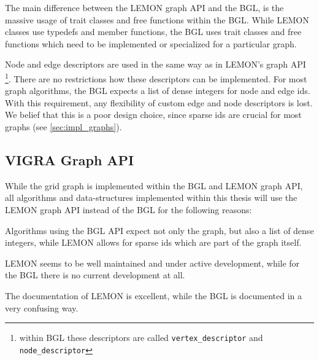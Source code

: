 The main difference between the LEMON graph API and the BGL,
is the massive usage of trait classes and free functions within the BGL.
While LEMON classes use typedefs and member functions, 
the BGL uses trait classes and free functions which need 
to be implemented or specialized for a particular graph.

Node and edge descriptors are used in the same way as in LEMON's
graph API \footnote{within BGL these descriptors are called \lstinline{vertex_descriptor} and 
\lstinline{node_descriptor}}.
There are no restrictions how these descriptors can be implemented.
For most graph algorithms, the BGL expects a list of dense integers for
node and edge ids.
With this requirement, any flexibility of custom edge and node descriptors is lost.
We belief that this is a poor design choice, since sparse ids
are crucial for most graphs (see \cref{sec:impl_graphs}).




\subsection{VIGRA Graph API}

While the grid graph is implemented within the BGL and LEMON graph API,
all algorithms and data-structures implemented within this thesis will
use the LEMON graph API instead of the BGL 
for the following reasons:
\begin{inparaenum}[(i)]
\item Algorithms using the BGL API expect not only the graph, but also 
a list of dense integers, while LEMON allows for sparse ids which 
are part of the graph itself.
\item LEMON seems to be well maintained and under active development,
while for the BGL there is no current development at all.
\item The documentation of LEMON is excellent, while the BGL is
documented in a very confusing way.
  
\end{inparaenum}

